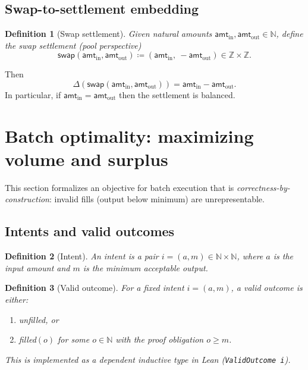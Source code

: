 \documentclass[11pt]{article}
\newtheorem{definition}{Definition}
\theoremstyle{remark}
\newcommand{\Z}{\mathbb{Z}}
\newcommand{\N}{\mathbb{N}}
\begin{document}
\subsection{Swap-to-settlement embedding}

\begin{definition}[Swap settlement]
Given natural amounts $\mathsf{amt}_{\mathrm{in}},\mathsf{amt}_{\mathrm{out}}\in\N$,
define the swap settlement (pool perspective)
\[
  \mathsf{swap}(\mathsf{amt}_{\mathrm{in}},\mathsf{amt}_{\mathrm{out}})
  \coloneqq (\mathsf{amt}_{\mathrm{in}},\ -\mathsf{amt}_{\mathrm{out}})\in\Z\times\Z.
\]
\end{definition}

Then
\[
  \Delta(\mathsf{swap}(\mathsf{amt}_{\mathrm{in}},\mathsf{amt}_{\mathrm{out}}))
  = \mathsf{amt}_{\mathrm{in}} - \mathsf{amt}_{\mathrm{out}}.
\]
In particular, if $\mathsf{amt}_{\mathrm{in}}=\mathsf{amt}_{\mathrm{out}}$ then the settlement is balanced.

\section{Batch optimality: maximizing volume and surplus}
\label{sec:batch-opt}

This section formalizes an objective for batch execution that is \emph{correctness-by-construction}:
invalid fills (output below minimum) are unrepresentable.

\subsection{Intents and valid outcomes}

\begin{definition}[Intent]
An \emph{intent} is a pair $i=(a,m)\in\N\times\N$, where $a$ is the input amount and $m$ is the minimum acceptable output.
\end{definition}

\begin{definition}[Valid outcome]
For a fixed intent $i=(a,m)$, a \emph{valid outcome} is either:
\begin{enumerate}[leftmargin=2em]
  \item \textsf{unfilled}, or
  \item \textsf{filled}$(o)$ for some $o\in\N$ with the proof obligation $o\ge m$.
\end{enumerate}
This is implemented as a dependent inductive type in Lean (\texttt{ValidOutcome i}).
\end{definition}
\end{document}
